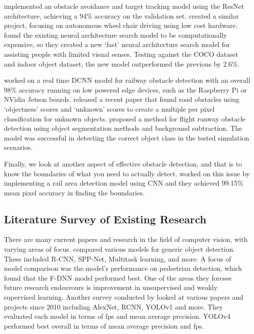 \documentclass[stu,12pt,floatsintext]{apa7}
\begin{document}
\textcite{fang_computer_2021} implemented an obstacle avoidance and target tracking model using the ResNet architecture, achieving a 94\% accuracy on the validation set. \textcite{farheen_object_2022} created a similar project, focusing on autonomous wheel chair driving using low cost hardware. \textcite{said_obstacle_2023} found the existing neural architecture search model to be computationally expensive, so they created a new `fast' neural architecture search model for assisting people with limited visual senses. Testing against the COCO dataset and indoor object dataset, the new model outperformed the previous by 2.6\%.

\textcite{jenefa_real-time_2023} worked on a real time DCNN model for railway obstacle detection with an overall 98\% accuracy running on low powered edge devices, such as the Raspberry Pi or NVidia Jetson boards. \textcite{noguchi_road_2024} released a recent paper that found road obstacles using `objectness' scores and `unknown' scores to create a multiple per pixel classification for unknown objects. \textcite{andreev_runway_2021} proposed a method for flight runway obstacle detection using object segmentation methods and background subtraction. The model was successful in detecting the correct object class in the tested simulation scenarios.

Finally, we look at another aspect of effective obstacle detection, and that is to know the boundaries of what you need to actually detect. \textcite{wang_efficient_2018} worked on this issue by implementing a rail area detection model using CNN and they achieved 99.15\% mean pixel accuracy in finding the boundaries.

\subsection{Literature Survey of Existing Research}
There are many current papers and research in the field of computer vision, with varying areas of focus. \textcite{zhao_object_2019} compared various models for generic object detection. These included R-CNN, SPP-Net, Multitask learning, and more. A focus of model comparison was the model's performance on pedestrian detection, which found that the F-DNN model \parencite{du_fused_2017} performed best.
One of the areas they foresee future research endeavours is improvement in unsupervised and weakly supervised learning. Another survey conducted by \textcite{turay_toward_2022} looked at various papers and projects since 2010 including AlexNet, RCNN, YOLOv1 and more. They evaluated each model in terms of fps and mean average precision. YOLOv4 performed best overall in terms of mean average precision and fps.
\end{document}
